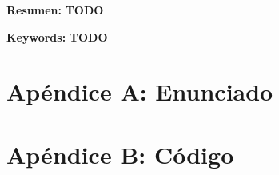 \documentclass[10pt,a4paper]{article}
\begin{document}
\vfill
\textbf{Resumen:}
\textbf{TODO}

\textbf{Keywords:} \textbf{TODO}

\newpage
\tableofcontents
\newpage



\newpage

\newpage

\newpage

\newpage

\section{Apéndice A: Enunciado}

\pagebreak
\section{Apéndice B: Código}
%
%
\pagebreak


\end{document}
